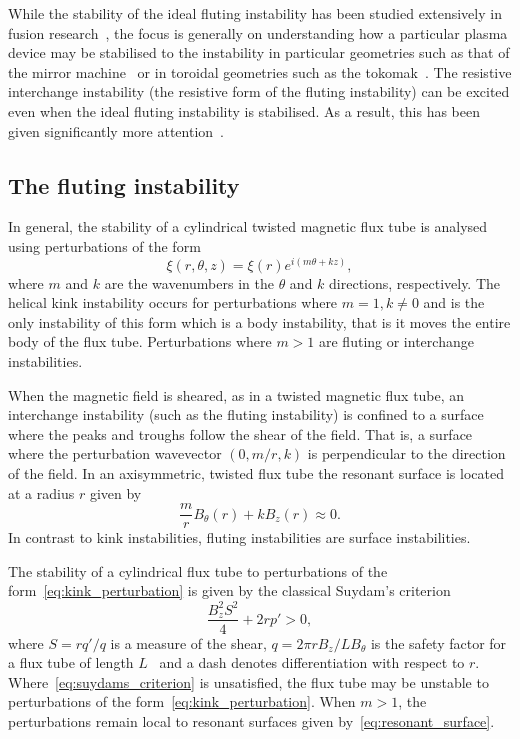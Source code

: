 While the stability of the ideal fluting instability has been studied extensively in fusion research~\cite{mikhailovskiiInstabilitiesConfinedPlasma1998,zhengAdvancedTokamakStability2015,wessonHydromagneticStabilityTokamaks1978}, the focus is generally on understanding how a particular plasma device may be stabilised to the instability in particular geometries such as that of the mirror machine~\cite{jungwirthTheoryFluteInstability1965} or in toroidal geometries such as the tokomak~\cite{shafranovFluteInstabilityCurrentcarrying1968}. The resistive interchange instability (the resistive form of the fluting instability) can be excited even when the ideal fluting instability is stabilised. As a result, this has been given significantly more attention~\cite{johnsonResistiveInterchangesNegativeV1967,correa-restrepoResistiveBallooningModes1983}.

\subsection{The fluting instability}

In general, the stability of a cylindrical twisted magnetic flux tube is analysed using perturbations of the form
\begin{equation}
  \label{eq:kink_perturbation}
\xi(r, \theta, z) = \xi(r) e^{i(m\theta + kz)},
\end{equation}
where $m$ and $k$ are the wavenumbers in the $\theta$ and $k$ directions, respectively. The helical kink instability occurs for perturbations where $m=1, k\ne0$ and is the only instability of this form which is a body instability, that is it moves the entire body of the flux tube. Perturbations where $m>1$ are fluting or interchange instabilities.

When the magnetic field is sheared, as in a twisted magnetic flux tube, an interchange instability (such as the fluting instability) is confined to a surface where the peaks and troughs follow the shear of the field. That is, a surface where the perturbation wavevector $(0, m/r, k)$ is perpendicular to the direction of the field. In an axisymmetric, twisted flux tube the resonant surface is located at a radius $r$ given by
\begin{equation}
  \label{eq:resonant_surface}
\frac{m}{r} B_{\theta}(r) + kB_z(r) \approx 0.
\end{equation}
In contrast to kink instabilities, fluting instabilities are surface instabilities.

The stability of a cylindrical flux tube to perturbations of the form~\ref{eq:kink_perturbation} is given by the classical Suydam's criterion
\begin{equation}
  \label{eq:suydams_criterion}
\frac{B_z^2 S^2}{4} + 2 r p' > 0,
\end{equation}
where $S = r q'/q$ is a measure of the shear, $q = 2\pi r B_z / L B_{\theta}$ is the safety factor for a flux tube of length $L$~\cite{mikhailovskiiInstabilitiesConfinedPlasma1998} and a dash denotes differentiation with respect to $r$. Where~\ref{eq:suydams_criterion} is unsatisfied, the flux tube may be unstable to perturbations of the form~\ref{eq:kink_perturbation}. When $m>1$, the perturbations remain local to resonant surfaces given by~\ref{eq:resonant_surface}.

